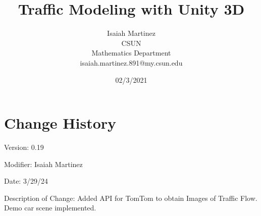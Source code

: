 \documentclass[a4paper,10pt]{article}
\begin{document}
%
    \title{Traffic Modeling with Unity 3D}

    \author{Isaiah Martinez \\ CSUN \\ Mathematics Department \\ isaiah.martinez.891@my.csun.edu}
          
    \date{02/3/2021}

    \maketitle
   
    \tableofcontents
 
    \newpage

    \section{Change History}

    Version: 0.19

    Modifier: Isaiah Martinez
    
    Date: 3/29/24
    
    Description of Change: Added API for TomTom to obtain Images of Traffic Flow.
    Demo car scene implemented.
    
    

    
\end{document}
